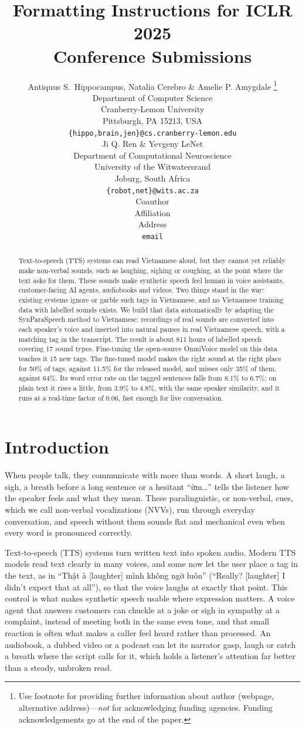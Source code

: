 \documentclass{article} %
\title{Formatting Instructions for ICLR 2025 \\ Conference Submissions}
\author{Antiquus S.~Hippocampus, Natalia Cerebro \& Amelie P. Amygdale \thanks{ Use footnote for providing further information
about author (webpage, alternative address)---\emph{not} for acknowledging
funding agencies.  Funding acknowledgements go at the end of the paper.} \\
Department of Computer Science\\
Cranberry-Lemon University\\
Pittsburgh, PA 15213, USA \\
\texttt{\{hippo,brain,jen\}@cs.cranberry-lemon.edu} \\
\And
Ji Q. Ren \& Yevgeny LeNet \\
Department of Computational Neuroscience \\
University of the Witwatersrand \\
Joburg, South Africa \\
\texttt{\{robot,net\}@wits.ac.za} \\
\AND
Coauthor \\
Affiliation \\
Address \\
\texttt{email}
}
\newcommand{\viet}[1]{{\fontencoding{T5}\selectfont #1}}
\begin{document}
\maketitle

\begin{abstract}
Text-to-speech (TTS) systems can read Vietnamese aloud, but they cannot yet reliably make
non-verbal sounds, such as laughing, sighing or coughing, at the point where the text asks for
them. These sounds make synthetic speech feel human in voice assistants, customer-facing AI
agents, audiobooks and videos. Two things stand in the way: existing systems ignore or garble
such tags in Vietnamese, and no Vietnamese training data with labelled sounds exists. We build
that data automatically by adapting the SynParaSpeech method to Vietnamese: recordings of real
sounds are converted into each speaker's voice and inserted into natural pauses in real
Vietnamese speech, with a matching tag in the transcript. The result is about 811 hours of
labelled speech covering 17 sound types. Fine-tuning the open-source OmniVoice model on this
data teaches it 15 new tags. The fine-tuned model makes the right sound at the right place for
50\% of tags, against 11.5\% for the released model, and misses only 35\% of them, against 64\%.
Its word error rate on the tagged sentences falls from 8.1\% to 6.7\%; on plain text it rises a
little, from 3.9\% to 4.8\%, with the same speaker similarity, and it runs at a real-time factor
of 0.06, fast enough for live conversation.
\end{abstract}

\section{Introduction}\label{sec:intro}
When people talk, they communicate with more than words. A short laugh, a sigh, a breath before
a long sentence or a hesitant ``\viet{ừm}\ldots'' tells the listener how the speaker feels and
what they mean. These paralinguistic, or non-verbal, cues, which we call non-verbal
vocalizations (NVVs), run through everyday conversation, and speech without them sounds flat and
mechanical even when every word is pronounced correctly.

Text-to-speech (TTS) systems turn written text into spoken audio. Modern TTS models read text
clearly in many voices, and some now let the user place a tag in the text, as in
``\viet{Thật à [laughter] mình không ngờ luôn}'' (``Really? [laughter] I didn't expect that at
all''), so that the voice laughs at exactly that point. This control is what makes synthetic
speech usable where expression matters. A voice agent that answers customers can chuckle at a
joke or sigh in sympathy at a complaint, instead of meeting both in the same even tone, and
that small reaction is often what makes a caller feel heard rather than processed. An
audiobook, a dubbed video or a podcast can let its narrator gasp, laugh or catch a breath where
the script calls for it, which holds a listener's attention far better than a steady,
unbroken read.
\end{document}
